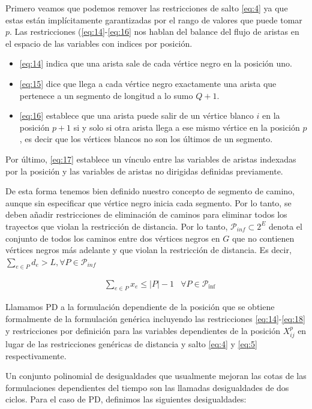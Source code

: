 \documentclass[10pt, a4paper]{article}
\theoremstyle{definition}
\begin{document}
Primero veamos que podemos remover las restricciones de salto \ref{eq:4} ya que estas están implícitamente garantizadas por el rango de valores que puede tomar $p$.
Las restricciones (\ref{eq:14}-\ref{eq:16} nos hablan del balance del flujo de aristas en el espacio de las variables con indices por posición.
\begin{itemize}
  \item \ref{eq:14} indica que una arista sale de cada vértice negro en la posición uno.
  \item \ref{eq:15} dice que llega a cada vértice negro exactamente una arista que pertenece a un segmento de longitud a lo sumo $Q+1$.
  \item \ref{eq:16} establece que una arista puede salir de un vértice blanco $i$ en la posición $p+1$ si y solo si otra arista llega a ese mismo vértice en la posición $p$, es decir que los vértices blancos no son los últimos de un segmento.
\end{itemize}
Por último, \ref{eq:17} establece un vínculo entre las variables de aristas indexadas por la posición y las variables de aristas no dirigidas definidas previamente.

De esta forma tenemos bien definido nuestro concepto de segmento de camino, aunque sin especificar que vértice negro inicia cada segmento. Por lo tanto, se deben añadir restricciones de eliminación de caminos para eliminar todos los trayectos que violan la restricción de distancia.
Por lo tanto, $\mathcal{P}_{inf} \subset 2^E$ denota el conjunto de todos los caminos entre dos vértices negros en $G$ que no contienen vértices negros más adelante y que violan la restricción de distancia.
Es decir, $\sum_{e \in P} d_e > L, \forall P \in \mathcal{P}_{inf}$


\begin{align}
	& \sum_{e \in P} x_{e} \leq|P|-1 & \forall P \in \mathcal{P}_{\mathrm{inf}} \label{eq:18}
\end{align}

Llamamos PD a la formulación dependiente de la posición que se obtiene formalmente de la formulación genérica incluyendo las restricciones \ref{eq:14}-\ref{eq:18} y restricciones por definición para las variables dependientes de la posición $X_{ij}^p$ en lugar de las restricciones genéricas de distancia y salto \ref{eq:4} y \ref{eq:5} respectivamente.

Un conjunto polinomial de desigualdades que usualmente mejoran las cotas de las formulaciones dependientes del tiempo son las llamadas desigualdades de dos ciclos. Para el caso de PD, definimos las siguientes desigualdades:
\end{document}
